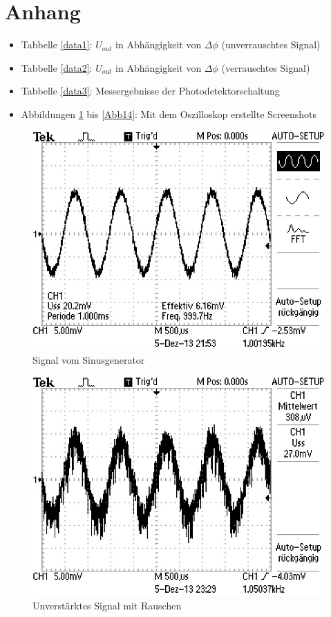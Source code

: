 \documentclass[11pt]{article}
\begin{document}
\section{Anhang}
\begin{itemize}
\item Tabbelle \ref{data1}: $U_{out}$ in Abhängigkeit von $\Delta\phi$ (unverrauschtes Signal)
\item Tabbelle \ref{data2}: $U_{out}$ in Abhängigkeit von $\Delta\phi$ (verrauschtes Signal)
\item Tabbelle \ref{data3}: Messergebnisse der Photodetektorschaltung
\item Abbildungen \ref{Abb1} bis \ref{Abb14}: Mit dem Oszilloskop erstellte Screenshots
 
\end{itemize}
\newpage
\begin{figure}[h]
\centering
\includegraphics[scale=0.85]{Bilder/1-sine.png}
\caption{Signal vom Sinusgenerator}
\label{Abb1}
\end{figure}
\begin{figure}[h]
\centering
\includegraphics[scale=0.85]{Bilder/2-noise.png}
\caption{Unverstärktes Signal mit Rauschen}
\label{Abb2}
\end{figure}
\end{document}
